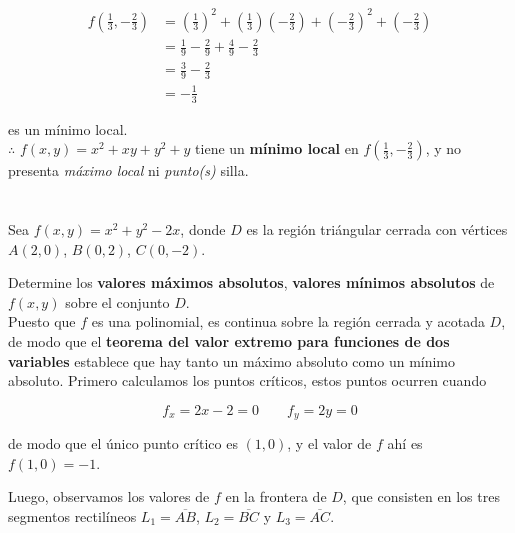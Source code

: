 \documentclass[12pt]{article}
\begin{document}
\begin{align*}
  f\left( \frac{1}{3}, -\frac{2}{3} \right)
  &= \left(\frac{1}{3}\right)^2 + \left(\frac{1}{3}\right)\left(-\frac{2}{3}\right) + \left(-\frac{2}{3}\right)^2 + \left(-\frac{2}{3}\right) \\
  &= \frac{1}{9} - \frac{2}{9} + \frac{4}{9} - \frac{2}{3}\\
  &= \frac{3}{9} - \frac{2}{3} \\
  &= -\frac{1}{3}
\end{align*}

es un mínimo local.\\

$\therefore $ $f(x, y) = x^2 + xy + y^2 + y$ tiene un \textbf{mínimo local} en $f\left( \frac{1}{3}, -\frac{2}{3} \right)$, y no presenta \textit{máximo local} ni \textit{punto(s)} silla.

\section{}

Sea $f(x, y) = x^2 + y^2 - 2x$, donde $D$ es la región triángular cerrada con vértices $A(2, 0)$, $B(0, 2)$, $C(0, -2)$.

Determine los \textbf{valores máximos absolutos}, \textbf{valores mínimos absolutos} de $f(x, y)$ sobre el conjunto $D$. \\

Puesto que $f$ es una polinomial, es continua sobre la región cerrada y acotada $D$, de modo que el \textbf{teorema del valor extremo para funciones de dos variables} establece que hay tanto un máximo absoluto como un mínimo absoluto. Primero calculamos los puntos críticos, estos puntos ocurren cuando

$$f_x = 2x - 2 = 0 \qquad f_y= 2y=0$$

de modo que el único punto crítico es $(1,0)$, y el valor de $f$ ahí es $f(1,0) = -1$.

Luego, observamos los valores de $f$ en la frontera de $D$, que consisten en los tres segmentos rectilíneos $L_1=\overline{AB}$, $L_2=\overline{BC}$ y $L_3=\overline{AC}$. \\
\end{document}
